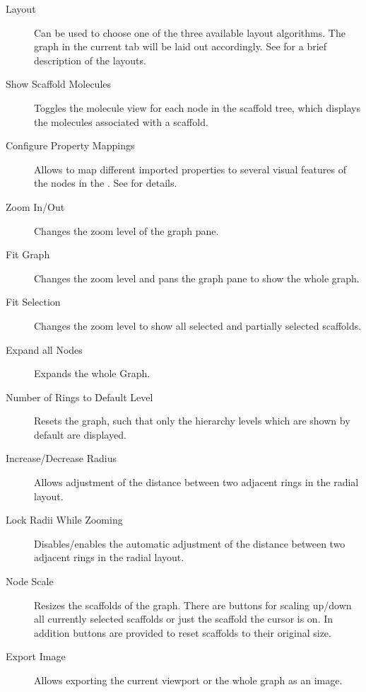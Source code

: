 \begin{description}
 \item [Layout] Can be used to choose one of the three available layout algorithms. The graph in the current tab will be laid out accordingly. 
See  for a brief description of the layouts.
 \item [Show Scaffold Molecules] Toggles the molecule view for each node in the
 scaffold tree, which displays the molecules associated with a scaffold.
 \item [Configure Property Mappings] Allows to map different imported
 properties to several visual features of the nodes in the \stree{}. See
  for details.
 \item [Zoom In/Out] Changes the zoom level of the graph pane.
 \item [Fit Graph] Changes the zoom level and pans the graph pane to show the
 whole graph.
 \item [Fit Selection] Changes the zoom level to show all selected and partially
 selected scaffolds.
 \item [Expand all Nodes] Expands the whole Graph.
 \item [Number of Rings to Default Level] Resets the graph, such that only the
 hierarchy levels which are shown by default are displayed.
 \item [Increase/Decrease Radius] Allows adjustment of the distance between two
 adjacent rings in the radial layout.
 \item [Lock Radii While Zooming] Disables/enables the automatic adjustment of the distance
 between two adjacent rings in the radial layout.
 \item [Node Scale] Resizes the scaffolds of the graph. There are buttons for
 scaling up/down all currently selected scaffolds or just the scaffold the
 cursor is on. In addition  buttons are provided to reset
 scaffolds to their original size.
 \item [Export Image] Allows exporting the current viewport or the whole graph
 as an image. 
\end{description}

